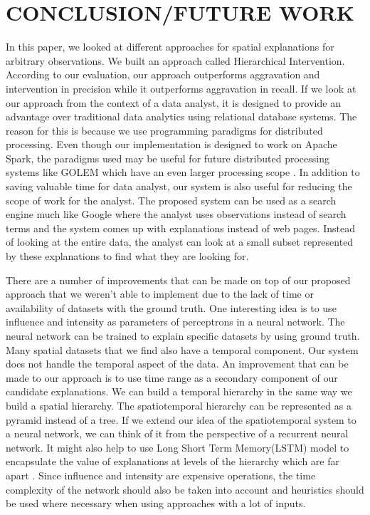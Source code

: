 \section{CONCLUSION/FUTURE WORK}
\label{chp:concl}
In this paper, we looked at different approaches for spatial explanations for arbitrary observations. We built an approach called Hierarchical Intervention. According to our evaluation, our approach outperforms aggravation and intervention in precision while it outperforms aggravation in recall. If we look at our approach from the context of a data analyst, it is designed to provide an advantage over traditional data analytics using relational database systems. The reason for this is because we use programming paradigms for distributed processing. Even though our implementation is designed to work on Apache Spark, the paradigms used may be useful for future distributed processing systems like GOLEM which have an even larger processing scope \cite{golem2018}. In addition to saving valuable time for data analyst, our system is also useful for reducing the scope of work for the analyst. The proposed system can be used as a search engine much like Google where the analyst uses observations instead of search terms and the system comes up with explanations instead of web pages. Instead of looking at the entire data, the analyst can look at a small subset represented by these explanations to find what they are looking for.

There are a number of improvements that can be made on top of our proposed approach that we weren't able to implement due to the lack of time or availability of datasets with the ground truth. One interesting idea is to use influence and intensity as parameters of perceptrons in a neural network\cite{grossberg1988nonlinear,widrow199030}. The neural network can be trained to explain specific datasets by using ground truth.
Many spatial datasets that we find also have a temporal component. Our system does not handle the temporal aspect of the data. An improvement that can be made to our approach is to use time range as a secondary component of our candidate explanations. We can build a temporal hierarchy in the same way we build a spatial hierarchy. The spatiotemporal hierarchy can be represented as a pyramid instead of a tree.
If we extend our idea of the spatiotemporal system to a neural network, we can think of it from the perspective of a recurrent neural network\cite{chung2016hierarchical}. It might also help to use Long Short Term Memory(LSTM) model to encapsulate the value of explanations at levels of the hierarchy which are far apart \cite{hochreiter1997long}.
Since influence and intensity are expensive operations, the time complexity of the network should also be taken into account and heuristics should be used where necessary when using approaches with a lot of inputs.

